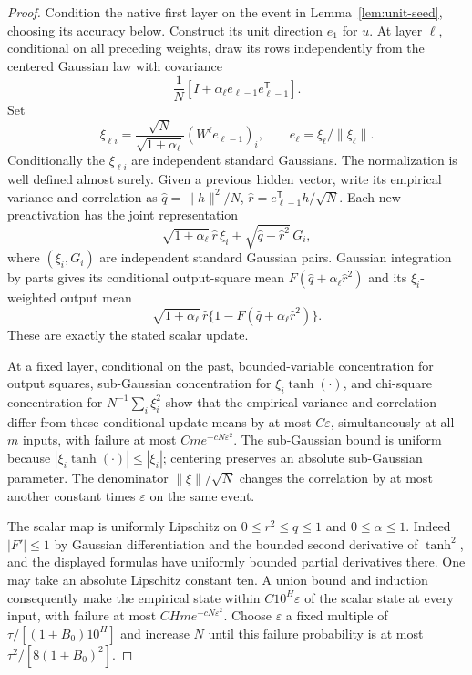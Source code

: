 \begin{proof}
Condition the native first layer on the event in Lemma~\ref{lem:unit-seed}, choosing its accuracy below. Construct its unit direction $e_1$ for $u$.
At layer $\ell$, conditional on all preceding weights, draw its rows independently from the centered Gaussian law with covariance
\[
 \frac1N[I+\alpha_\ell e_{\ell-1}e_{\ell-1}^{\mathsf T}].
\]
Set
\[
 \xi_{\ell i}=\frac{\sqrt N}{\sqrt{1+\alpha_\ell}}
                   (W^\ell e_{\ell-1})_i,
 \qquad e_\ell=\xi_\ell/\|\xi_\ell\|.
\]
Conditionally the $\xi_{\ell i}$ are independent standard Gaussians. The normalization is well defined almost surely. Given a previous hidden vector, write its empirical variance and correlation as
$\widehat q=\|h\|^2/N$, $\widehat r=e_{\ell-1}^{\mathsf T}h/\sqrt N$. Each new preactivation has the joint representation
\[
 \sqrt{1+\alpha_\ell}\,\widehat r\,\xi_i
       +\sqrt{\widehat q-\widehat r^2}\,G_i,
\]
where $(\xi_i,G_i)$ are independent standard Gaussian pairs. Gaussian integration by parts gives its conditional output-square mean $F(\widehat q+\alpha_\ell\widehat r^2)$ and its $\xi_i$-weighted output mean
\[
 \sqrt{1+\alpha_\ell}\,\widehat r
       \{1-F(\widehat q+\alpha_\ell\widehat r^2)\}.
\]
These are exactly the stated scalar update.

At a fixed layer, conditional on the past, bounded-variable concentration for output squares, sub-Gaussian concentration for $\xi_i\tanh(\cdot)$, and chi-square concentration for $N^{-1}\sum_i\xi_i^2$ show that the empirical variance and correlation differ from these conditional update means by at most $C\varepsilon$, simultaneously at all $m$ inputs, with failure at most $Cm e^{-cN\varepsilon^2}$. The sub-Gaussian bound is uniform because $|\xi_i\tanh(\cdot)|\le|\xi_i|$; centering preserves an absolute sub-Gaussian parameter. The denominator $\|\xi\|/\sqrt N$ changes the correlation by at most another constant times $\varepsilon$ on the same event.

The scalar map is uniformly Lipschitz on $0\le r^2\le q\le1$ and $0\le\alpha\le1$. Indeed $|F'|\le1$ by Gaussian differentiation and the bounded second derivative of $\tanh^2$, and the displayed formulas have uniformly bounded partial derivatives there. One may take an absolute Lipschitz constant ten. A union bound and induction consequently make the empirical state within $C10^H\varepsilon$ of the scalar state at every input, with failure at most $CHm e^{-cN\varepsilon^2}$.
Choose $\varepsilon$ a fixed multiple of $\tau/[(1+B_0)10^H]$ and increase $N$ until this failure probability is at most $\tau^2/[8(1+B_0)^2]$.


\end{proof}
